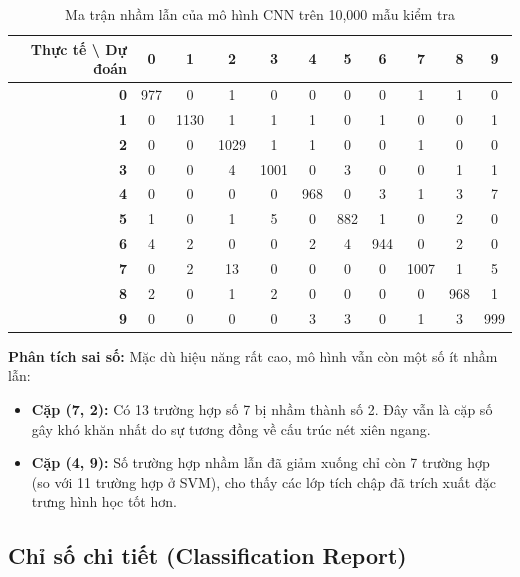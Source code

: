 \documentclass[../DoAn.tex]{subfiles}
\begin{document}
\begin{table}[H]
\centering
\small
\caption{Ma trận nhầm lẫn của mô hình CNN trên 10,000 mẫu kiểm tra}
\label{tab:cnn_cm}
\begin{tabular}{r|cccccccccc}
\hline
\textbf{Thực tế \textbackslash{} Dự đoán} & \textbf{0} & \textbf{1} & \textbf{2} & \textbf{3} & \textbf{4} & \textbf{5} & \textbf{6} & \textbf{7} & \textbf{8} & \textbf{9} \\ \hline
\textbf{0} & 977 & 0   & 1   & 0   & 0   & 0   & 0   & 1   & 1   & 0   \\
\textbf{1} & 0   & 1130 & 1   & 1   & 1   & 0   & 1   & 0   & 0   & 1   \\
\textbf{2} & 0   & 0   & 1029 & 1   & 1   & 0   & 0   & 1   & 0   & 0   \\
\textbf{3} & 0   & 0   & 4   & 1001 & 0   & 3   & 0   & 0   & 1   & 1   \\
\textbf{4} & 0   & 0   & 0   & 0   & 968 & 0   & 3   & 1   & 3   & 7   \\
\textbf{5} & 1   & 0   & 1   & 5   & 0   & 882 & 1   & 0   & 2   & 0   \\
\textbf{6} & 4   & 2   & 0   & 0   & 2   & 4   & 944 & 0   & 2   & 0   \\
\textbf{7} & 0   & 2   & 13  & 0   & 0   & 0   & 0   & 1007 & 1   & 5   \\
\textbf{8} & 2   & 0   & 1   & 2   & 0   & 0   & 0   & 0   & 968 & 1   \\
\textbf{9} & 0   & 0   & 0   & 0   & 3   & 3   & 0   & 1   & 3   & 999 \\ \hline
\end{tabular}
\end{table}

\textbf{Phân tích sai số:} Mặc dù hiệu năng rất cao, mô hình vẫn còn một số ít nhầm lẫn:
\begin{itemize}
    \item \textbf{Cặp (7, 2):} Có 13 trường hợp số 7 bị nhầm thành số 2. Đây vẫn là cặp số gây khó khăn nhất do sự tương đồng về cấu trúc nét xiên ngang.
    \item \textbf{Cặp (4, 9):} Số trường hợp nhầm lẫn đã giảm xuống chỉ còn 7 trường hợp (so với 11 trường hợp ở SVM), cho thấy các lớp tích chập đã trích xuất đặc trưng hình học tốt hơn.\\
\end{itemize}

\subsection{Chỉ số chi tiết (Classification Report)}
\end{document}
